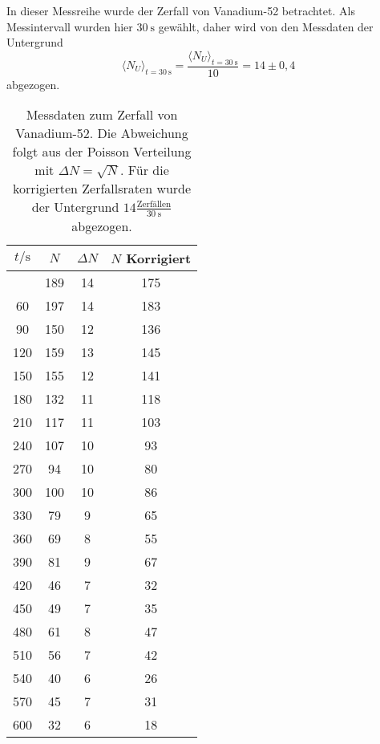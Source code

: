 In dieser Messreihe wurde der Zerfall von Vanadium-52 betrachtet. Als Messintervall wurden hier
$\SI{30}{\second}$ gewählt, daher wird von den Messdaten der Untergrund
\begin{equation}
	\langle N_U \rangle_{t=\SI{30}{\second}} = 
	\frac{\langle N_U \rangle_{t=\SI{30}{\second}}}{10} = 14 \pm 0,4
\end{equation}
abgezogen.

\begin{longtable}{c c c c}
	\caption{Messdaten zum Zerfall von Vanadium-52. Die Abweichung folgt aus der Poisson Verteilung
		mit $\Delta N = \sqrt{N}$. Für die korrigierten Zerfallsraten wurde der Untergrund 
	$14 \frac{\text{Zerfällen}}{\SI{30}{\second}}$ abgezogen.} \label{tab:vanadium} \\
		\hline
		$t / \si{\second}$ & $N$ & $\Delta N$ &$N$ Korrigiert \\
		\hline
		\endhead
		\hline
		\endfoot
		30   	&      189  	& 14 &      175 \\
		  60   	&      197  	& 14 &      183 \\
		  90   	&      150  	& 12 &      136 \\
		 120   	&      159  	& 13 &      145 \\
		 150   	&      155  	& 12 &      141 \\
		 180   	&      132  	& 11 &      118 \\
		 210   	&      117  	& 11 &      103 \\
		 240   	&      107  	& 10 &       93 \\
		 270   	&       94  	& 10 &       80 \\
		 300   	&      100  	& 10 &       86 \\
		 330   	&       79  	&  9 &       65 \\
		 360   	&       69  	&  8 &       55 \\
		 390   	&       81  	&  9 &       67 \\
		 420   	&       46  	&  7 &       32 \\
		 450   	&       49  	&  7 &       35 \\
		 480   	&       61  	&  8 &       47 \\
		 510   	&       56  	&  7 &       42 \\
		 540   	&       40  	&  6 &       26 \\
		 570   	&       45  	&  7 &       31 \\
		 600   	&       32  	&  6 &       18 \\

\end{longtable}
